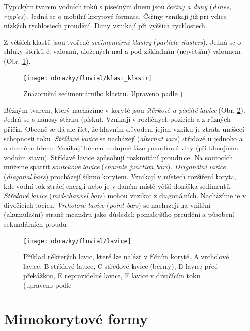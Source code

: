 Typickým tvarem vodních toků s písečným dnem jsou \emph{čeřiny a duny} (\textit{dunes, ripples}). Jedná se o mobilní korytové formace. Čeřiny vznikají již pri velice nízkých rychlostech proudění. Duny vznikají při vyšších rychlostech. 

Z větších klastů jsou tvořené \emph{sedimentární klastry} (\textit{particle clusters}). Jedná se o shluky štěrků či valounů, uložených nad a pod základním (největším) valounem (Obr. \ref{fig:klastklastr}). 

\begin{figure}
	\centering
	\texttt{[image: obrazky/fluvial/klast\_klastr]}
	\caption{Znázornění sedimentárního klastru. Upraveno podle \textcite{galiaFluvialniGeomorfologie2017})}
	\label{fig:klastklastr}
\end{figure}

Běžným tvarem, který nacházíme v korytě jsou \emph{štěrkové a písčité lavice} (Obr. \ref{fig:lavice}). Jedná se o nánosy štěrku (písku). Vznikají v rozličných pozicích a z různých příčin. Obecně se dá ale říct, že hlavním důvodem jejich vzniku je ztráta unášecí schopnosti toku. \emph{Střídavé lavice} se nacházejí (\textit{alternat bars}) střidavě u jednoho a u druhého břehu. Vznikají během sestupné fáze povodňové vlny (při klesajícím vodním stavu). Střídavé lavice způsobují rozkmitání proudnice. Na soutocích můžeme spatřit \emph{soutokové lavice} (\textit{channle junction bars}). \emph{Diagonální lavice} (\textit{diagonal bars}) procházejí šikmo korytem. Vznikají v místech rozšíření koryta, kde vodní tok ztrácí energii nebo je v daném místě větší donáška sedimentů. \emph{Středové lavice} (\textit{mid-channel bars}) mohou vnzikat z diagonálních. Nacházíme je v divočících tocích. \emph{Vrcholové lavice} (\textit{point bars}) se nacházejí na vnitřní (akumulační) straně meandru jako důsledek pomalejšího proudění a působení sekundárních proudů.

\begin{figure}
	\centering
	\texttt{[image: obrazky/fluvial/lavice]}
	\caption{Příklad některých lavic, které lze nalézt v říčním korytě. A vrcholové lavice, B střídavé lavice, C středové lavice (bermy), D lavice před překážkou, E nepravidelné lavice, F lavice v divočícím toku  (upraveno podle \textcite{radecki-pawlikStreamHydraulicsGranulometry2004} }
	\label{fig:lavice}
\end{figure}

\section{Mimokorytové formy}

